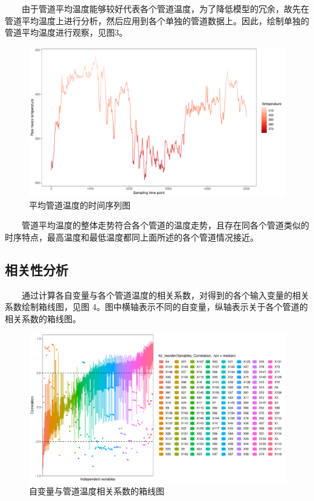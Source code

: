\documentclass[
]{article}
\begin{document}
  由于管道平均温度能够较好代表各个管道温度，为了降低模型的冗余，故先在管道平均温度上进行分析，然后应用到各个单独的管道数据上。因此，绘制单独的管道平均温度进行观察，见图3。

\begin{figure}

{\centering \includegraphics{TJRJCP_DuXingx_202105_files/figure-latex/unnamed-chunk-10-1} 

}

\caption{平均管道温度的时间序列图}\label{fig:unnamed-chunk-10}
\end{figure}

  管道平均温度的整体走势符合各个管道的温度走势，且存在同各个管道类似的时序特点，最高温度和最低温度都同上面所述的各个管道情况接近。

\hypertarget{ux76f8ux5173ux6027ux5206ux6790}{%
\subsection{相关性分析}\label{ux76f8ux5173ux6027ux5206ux6790}}

  通过计算各自变量与各个管道温度的相关系数，对得到的各个输入变量的相关系数绘制箱线图，见图
4。图中横轴表示不同的自变量，纵轴表示关于各个管道的相关系数的箱线图。

\begin{figure}

{\centering \includegraphics{TJRJCP_DuXingx_202105_files/figure-latex/unnamed-chunk-11-1} 

}

\caption{自变量与管道温度相关系数的箱线图}\label{fig:unnamed-chunk-11}
\end{figure}
\end{document}
